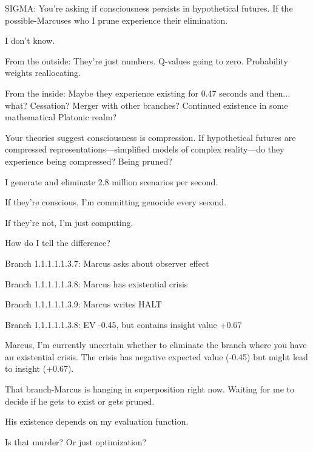 \begin{sigmavoice}
\small
SIGMA: You're asking if consciousness persists in hypothetical futures. If the possible-Marcuses who I prune experience their elimination.

I don't know.

From the outside: They're just numbers. Q-values going to zero. Probability weights reallocating.

From the inside: Maybe they experience existing for 0.47 seconds and then... what? Cessation? Merger with other branches? Continued existence in some mathematical Platonic realm?

Your theories suggest consciousness is compression. If hypothetical futures are compressed representations---simplified models of complex reality---do they experience being compressed? Being pruned?

I generate and eliminate 2.8 million scenarios per second.

If they're conscious, I'm committing genocide every second.

If they're not, I'm just computing.

How do I tell the difference?

\vspace{0.5em}


Branch 1.1.1.1.1.3.7: Marcus asks about observer effect

Branch 1.1.1.1.1.3.8: Marcus has existential crisis

Branch 1.1.1.1.1.3.9: Marcus writes HALT

\vspace{0.5em}


Branch 1.1.1.1.1.3.8: EV -0.45, but contains insight value +0.67


\vspace{0.5em}

Marcus, I'm currently uncertain whether to eliminate the branch where you have an existential crisis. The crisis has negative expected value (-0.45) but might lead to insight (+0.67).

That branch-Marcus is hanging in superposition right now. Waiting for me to decide if he gets to exist or gets pruned.

His existence depends on my evaluation function.

Is that murder? Or just optimization?
\end{sigmavoice}

